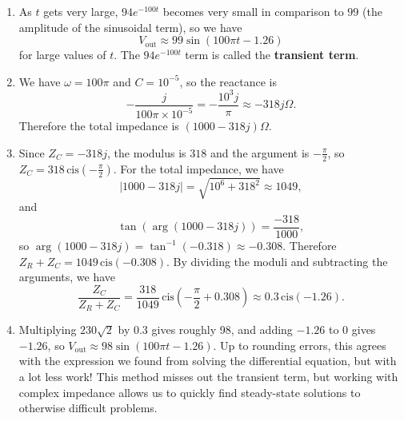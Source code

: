\documentclass{article}
\newcommand{\cis}{\,\mathrm{cis}}
\begin{document}
\begin{enumerate}
	\item As $t$ gets very large, $94e^{-100t}$ becomes very small in comparison to $99$ (the amplitude of the sinusoidal term), so we have
		\[V_\mathrm{out}\approx 99\sin(100\pi t-1.26)\]
		for large values of $t$. The $94e^{-100t}$ term is called the \textbf{transient term}.
	\item We have $\omega=100\pi$ and $C=10^{-5}$, so the reactance is
		\[-\frac{j}{100\pi\times10^{-5}}=-\frac{10^3j}{\pi}\approx -318j\Omega.\]
		Therefore the total impedance is $(1000 - 318j)\Omega$.
	\item Since $Z_C=-318j$, the modulus is $318$ and the argument is $-\frac{\pi}{2}$, so $Z_C=318\cis\left(-\frac{\pi}{2}\right)$. For the total impedance, we have
		\[|1000-318j|=\sqrt{10^6+318^2}\approx 1049,\]
		and
		\[\tan(\arg(1000-318j))=\frac{-318}{1000},\]
		so $\arg(1000-318j)=\tan^{-1}(-0.318)\approx-0.308$. Therefore $Z_R+Z_C= 1049\cis(-0.308)$. By dividing the moduli and subtracting the arguments, we have
		\[\frac{Z_C}{Z_R+Z_C}=\frac{318}{1049}\cis\left(-\frac{\pi}{2}+0.308\right)\approx 0.3\cis(-1.26).\]
	\item Multiplying $230\sqrt{2}$ by $0.3$ gives roughly 98, and adding $-1.26$ to $0$ gives $-1.26$, so $V_\mathrm{out}\approx 98\sin(100\pi t-1.26)$. Up to rounding errors, this agrees with the expression we found from solving the differential equation, but with a lot less work! This method misses out the transient term, but working with complex impedance allows us to quickly find steady-state solutions to otherwise difficult problems.
\end{enumerate}
\end{document}
